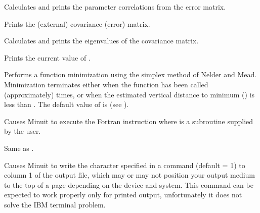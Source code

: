 
Calculates and prints the parameter correlations from the error matrix.


Prints the (external) covariance (error) matrix.


Calculates and prints the eigenvalues of the covariance matrix.


Prints the current value of .


Performs a function minimization using the simplex method of Nelder and
Mead. Minimization terminates either when the function has been called
(approximately) \Lit{[maxcalls]} times, or when the estimated vertical
distance to minimum () is less than \Lit{[tolerance]}. 
The default value of \Lit{[tolerance]} is  
(see ).


Causes Minuit to execute the Fortran instruction 
where  is a subroutine supplied by the user.


Same as .


Causes Minuit to write the character specified in a
 command (default = 1) to column 1 of the
output file, which may or may not position your output medium
to the top of a page depending on the device and system.
This command can be expected to work properly only for printed
output, unfortunately it does not solve the IBM terminal problem.
